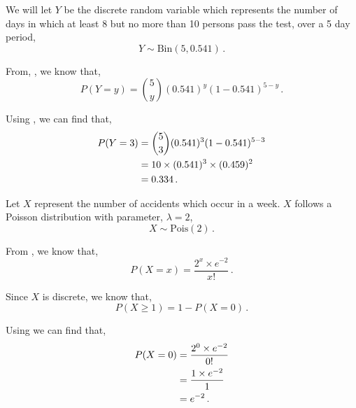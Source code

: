 \begin{subquestions}
\begin{subsubquestions}

\subsubquestion

We will let $Y$ be the discrete random variable which represents the number of days in which at least 8 but no more than 10 persons pass the test, over a 5 day period,
\begin{equation}
	Y \sim \text{Bin}(5,0.541) \,.
\end{equation}

From, , we know that,
\begin{equation}
	P(Y = y) = { 5 \choose y} (0.541)^y (1-0.541)^{5-y} \,. \label{2009:q4:BinEqn2}
\end{equation}

Using , we can find that,
\begin{align}
	P(Y=3) & = { 5 \choose 3} (0.541)^3 (1-0.541)^{5-3} \nonumber \\
	       & = 10 \times (0.541)^3 \times (0.459)^{2} \nonumber \\
	       & = 0.334 \,.
\end{align}

\end{subsubquestions}

	
\subquestion

Let $X$ represent the number of accidents which occur in a week. $X$ follows a Poisson distribution with parameter, $\lambda =2$,
\begin{equation}
	X \sim \text{Pois}(2) \,.
\end{equation}

From , we know that,
\begin{equation}
	P(X = x) =\frac{2^x \times e^{-2}}{x!} \,. \label{2009:q4:PoisEqn1}
\end{equation}

Since $X$ is discrete, we know that,
\begin{equation}
	P(X \geq 1) = 1 - P(X=0) \,. \label{2009:q4:PoisEqn2}
\end{equation}

Using  we can find that,
\begin{align}
	P(X=0) & = \frac{2^0 \times e^{-2}}{0!} \nonumber \\
	     & = \frac{1 \times e^{-2}}{1} \nonumber \\
	     & = e^{-2} \,. 
\end{align}


\end{subquestions}

